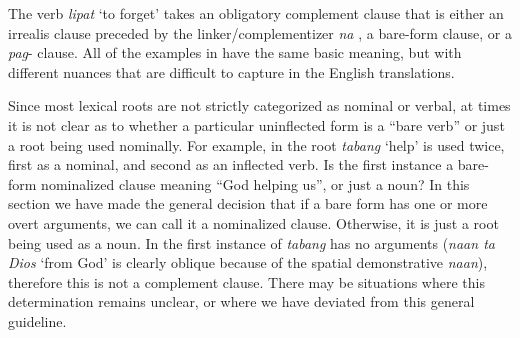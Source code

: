 The verb \textit{lipat} ‘to forget’ takes an obligatory complement clause that is either an irrealis clause preceded by the linker/complementizer \textit{na} , a bare-form clause, or a \textit{pag}{}- clause. All of the examples in  have the same basic meaning, but with different nuances that are difficult to capture in the English translations.
\ea
\label{bkm:Ref115163660}
    \z
\z

Since most lexical roots are not strictly categorized as nominal or verbal, at times it is not clear as to whether a particular uninflected form is a “bare verb” or just a root being used nominally. For example, in  the root \textit{tabang} ‘help’ is used twice, first as a nominal, and second as an inflected verb. Is the first instance a bare-form nominalized clause meaning “God helping us”, or just a noun? In this section we have made the general decision that if a bare form has one or more overt arguments, we can call it a nominalized clause. Otherwise, it is just a root being used as a noun. In  the first instance of \textit{tabang} has no arguments (\textit{naan ta Dios} `from God' is clearly oblique because of the spatial demonstrative \textit{naan}), therefore this is not a complement clause. There may be situations where this determination remains unclear, or where we have deviated from this general guideline.

